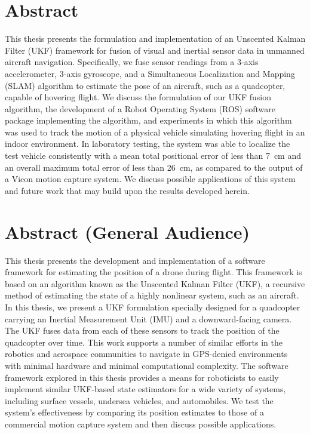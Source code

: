 \chapter*{Abstract}

This thesis presents the formulation and implementation of an Unscented Kalman Filter (UKF) framework for fusion of visual and inertial sensor data in unmanned aircraft navigation. Specifically, we fuse sensor readings from a 3-axis accelerometer, 3-axis gyroscope, and a Simultaneous Localization and Mapping (SLAM) algorithm to estimate the pose of an aircraft, such as a quadcopter, capable of hovering flight. We discuss the formulation of our UKF fusion algorithm, the development of a Robot Operating System (ROS) software package implementing the algorithm, and experiments in which this algorithm was used to track the motion of a physical vehicle simulating hovering flight in an indoor environment. In laboratory testing, the system was able to localize the test vehicle consistently with a mean total positional error of less than 7~cm and an overall maximum total error of less than 26~cm, as compared to the output of a Vicon motion capture system. We discuss possible applications of this system and future work that may build upon the results developed herein.

\thispagestyle{empty}

\chapter*{Abstract (General Audience)}


This thesis presents the development and implementation of a software framework for estimating the position of a drone during flight. This framework is based on an algorithm known as the Unscented Kalman Filter (UKF), a recursive method of estimating the state of a highly nonlinear system, such as an aircraft. In this thesis, we present a UKF formulation specially designed for a quadcopter carrying an Inertial Measurement Unit (IMU) and a downward-facing camera. The UKF fuses data from each of these sensors to track the position of the quadcopter over time. This work supports a number of similar efforts in the robotics and aerospace communities to navigate in GPS-denied environments with minimal hardware and minimal computational complexity. The software framework explored in this thesis provides a means for roboticists to easily implement similar UKF-based state estimators for a wide variety of systems, including surface vessels, undersea vehicles, and automobiles. We test the system's effectiveness by comparing its position estimates to those of a commercial motion capture system and then discuss possible applications.

\thispagestyle{empty}

